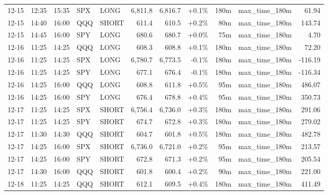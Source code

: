 \documentclass[11pt,a4paper,twoside]{article}
\begin{document}
\begin{center}
\begin{longtable}{>{\color{txtmain}}l l l l l r r r r >{\color{txtmain}}l r}
12-15 & 12:35 & 15:35 & SPX & LONG & 6,811.8 & 6,816.7 & \textcolor{wingreen}{+0.1\%} & 180m & max\_time\_180m & \textcolor{wingreen}{61.94} \\
12-15 & 14:40 & 16:00 & QQQ & SHORT & 611.4 & 610.5 & \textcolor{wingreen}{+0.2\%} & 80m & max\_time\_180m & \textcolor{wingreen}{143.74} \\
12-15 & 14:45 & 16:00 & SPY & LONG & 680.6 & 680.7 & \textcolor{wingreen}{+0.0\%} & 75m & max\_time\_180m & \textcolor{wingreen}{4.70} \\
12-16 & 11:25 & 14:25 & QQQ & LONG & 608.3 & 608.8 & \textcolor{wingreen}{+0.1\%} & 180m & max\_time\_180m & \textcolor{wingreen}{72.20} \\
12-16 & 11:25 & 14:25 & SPX & LONG & 6,780.7 & 6,773.5 & \textcolor{lossred}{-0.1\%} & 180m & max\_time\_180m & \textcolor{lossred}{-116.19} \\
12-16 & 11:25 & 14:25 & SPY & LONG & 677.1 & 676.4 & \textcolor{lossred}{-0.1\%} & 180m & max\_time\_180m & \textcolor{lossred}{-116.34} \\
12-16 & 14:25 & 16:00 & QQQ & LONG & 608.8 & 611.8 & \textcolor{wingreen}{+0.5\%} & 95m & max\_time\_180m & \textcolor{wingreen}{486.07} \\
12-16 & 14:25 & 16:00 & SPY & LONG & 676.4 & 678.8 & \textcolor{wingreen}{+0.4\%} & 95m & max\_time\_180m & \textcolor{wingreen}{350.73} \\
12-17 & 11:25 & 14:25 & SPX & SHORT & 6,756.4 & 6,736.0 & \textcolor{wingreen}{+0.3\%} & 180m & max\_time\_180m & \textcolor{wingreen}{291.06} \\
12-17 & 11:25 & 14:25 & SPY & SHORT & 674.7 & 672.8 & \textcolor{wingreen}{+0.3\%} & 180m & max\_time\_180m & \textcolor{wingreen}{279.02} \\
12-17 & 11:30 & 14:30 & QQQ & SHORT & 604.7 & 601.8 & \textcolor{wingreen}{+0.5\%} & 180m & max\_time\_180m & \textcolor{wingreen}{482.78} \\
12-17 & 14:25 & 16:00 & SPX & SHORT & 6,736.0 & 6,721.0 & \textcolor{wingreen}{+0.2\%} & 95m & max\_time\_180m & \textcolor{wingreen}{213.57} \\
12-17 & 14:25 & 16:00 & SPY & SHORT & 672.8 & 671.3 & \textcolor{wingreen}{+0.2\%} & 95m & max\_time\_180m & \textcolor{wingreen}{205.54} \\
12-17 & 14:30 & 16:00 & QQQ & SHORT & 601.8 & 600.4 & \textcolor{wingreen}{+0.2\%} & 90m & max\_time\_180m & \textcolor{wingreen}{221.00} \\
12-18 & 11:25 & 14:25 & QQQ & SHORT & 612.1 & 609.5 & \textcolor{wingreen}{+0.4\%} & 180m & max\_time\_180m & \textcolor{wingreen}{411.49} \\

\end{longtable}
\end{center}
\end{document}

